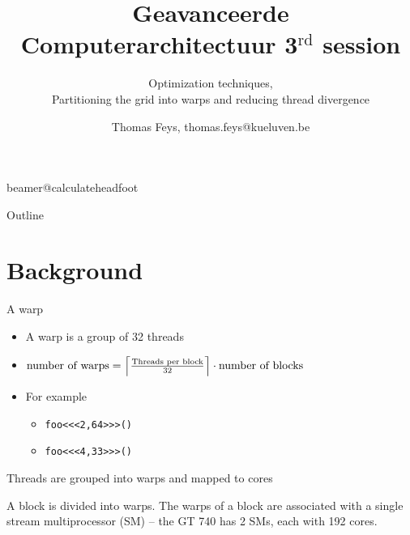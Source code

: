 \documentclass[11pt,t]{beamer}
\title[Geavanceerde Computerarchitectuur 3$^{\text{rd}}$ session]{Geavanceerde Computerarchitectuur 3$^{\text{rd}}$ session} %
\subtitle{Optimization techniques, \\ Partitioning the grid into warps and reducing thread divergence}
\author{Thomas Feys, {\footnotesize thomas.feys@kueluven.be}}
\institute{DRAMCO -- WaveCore -- ESAT}
\date{}
\newcommand{\inline}[1]{ \colorbox{mygray}{\lstinline{#1}}}
\DeclarePairedDelimiter\ceil{\lceil}{\rceil}
\begin{document}
\csname beamer@calculateheadfoot\endcsname %


\begin{frame}
	\titlepage
\end{frame}
	

\begin{frame}{Outline}
	\hfill	{\large \parbox{.961\textwidth}{\tableofcontents[hideothersubsections]}}
\end{frame}




\section{Background}


\begin{frame}{A warp}
    \begin{itemize}\setlength\itemsep{1em}
        \item A warp is a group of 32 threads
        \item $\text{number of warps} = \ceil*{ \frac{\text{Threads per block}}{\text{32}}} \cdot \text{number of blocks}$
        \item For example
        \begin{itemize}\setlength\itemsep{0.5em}\vspace{1mm}
            \item \inline{foo<<<2,64>>>()} 
            \item \inline{foo<<<4,33>>>()} 
        \end{itemize}
    \end{itemize}
\end{frame}


\begin{frame}{Threads are grouped into warps and mapped to cores}
    \vspace{-2mm}
    
    \begin{figure}
        \centering
        \resizebox{0.9\textwidth}{!}{}
    \end{figure}

    A block is divided into warps. The warps of a block are associated with a single stream multiprocessor (SM) -- the GT 740 has 2 SMs, each with 192 cores.
    
\end{frame}
\end{document}
